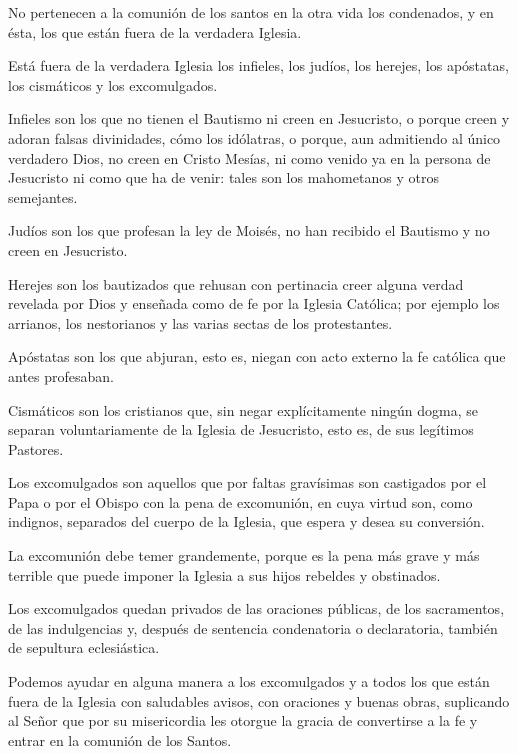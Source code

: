 No pertenecen a la comunión de los santos en la otra vida los condenados, y en
ésta, los que están fuera de la verdadera Iglesia.

 Está fuera de la
verdadera Iglesia los infieles, los judíos, los herejes, los apóstatas, los cismáticos y los excomulgados.

 Infieles son los que no tienen el Bautismo ni
creen en Jesucristo, o porque creen y adoran falsas divinidades, cómo los
idólatras, o porque, aun admitiendo al único verdadero Dios, no creen en Cristo
Mesías, ni como venido ya en la persona de Jesucristo ni como que ha de venir:
tales son los mahometanos y otros semejantes.

 Judíos son los que profesan la ley de Moisés,
no han recibido el Bautismo y no creen en Jesucristo.

 Herejes son los bautizados que rehusan con
pertinacia creer alguna verdad revelada por Dios y enseñada como de fe por la
Iglesia Católica; por ejemplo los arrianos, los nestorianos y las varias sectas de los protestantes.

 Apóstatas son los que abjuran, esto es,
niegan con acto externo la fe católica que antes profesaban.

 Cismáticos son los cristianos que, sin
negar explícitamente ningún dogma, se separan voluntariamente de la Iglesia de
Jesucristo, esto es, de sus legítimos Pastores.

 Los excomulgados son aquellos que
por faltas gravísimas son castigados por el Papa o por el Obispo con la pena de
excomunión, en cuya virtud son, como indignos, separados del cuerpo de la
Iglesia, que espera y desea su conversión.

 La excomunión debe temer
grandemente, porque es la pena más grave y más terrible que puede imponer la
Iglesia a sus hijos rebeldes y obstinados.

 Los
excomulgados quedan privados de las oraciones públicas, de los sacramentos, de
las indulgencias y, después de sentencia condenatoria o declaratoria, también de
sepultura eclesiástica.

 Podemos
ayudar en alguna manera a los excomulgados y a todos los que están fuera de la
Iglesia con saludables avisos, con oraciones y buenas obras, suplicando al Señor
que por su misericordia les otorgue la gracia de convertirse a la fe y entrar en la
comunión de los Santos.


